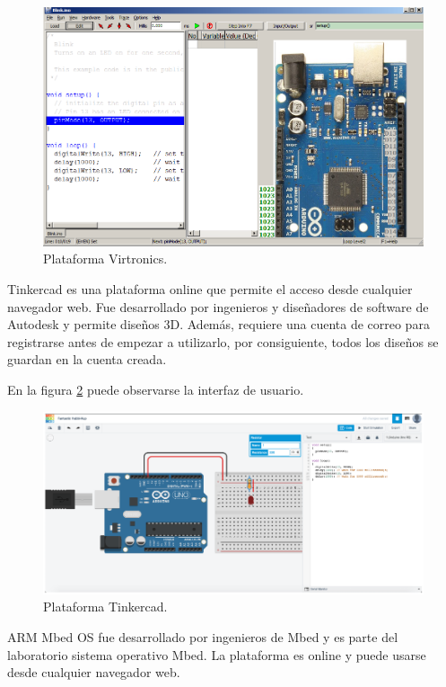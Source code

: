 \begin{figure}[ht]
	\centering
	\includegraphics[scale=.35]{./Figures/Virtronics.png}
	\caption{Plataforma Virtronics.}
	\label{fig:Virtronics}
\end{figure}


Tinkercad \citep{Tinkercad} es una plataforma online que permite el acceso desde cualquier navegador web. Fue desarrollado por ingenieros y diseñadores de software de Autodesk \citep{Autodesk} y permite diseños 3D. Además, requiere una cuenta de correo para registrarse antes de empezar a utilizarlo, por consiguiente, todos los diseños se guardan en la cuenta creada.

En la figura \ref{fig:Tinkercad} puede observarse la interfaz de usuario.

\begin{figure}[ht]
	\centering
	\includegraphics[scale=.42]{./Figures/Tinkercad.png}
	\caption{Plataforma Tinkercad.}
	\label{fig:Tinkercad}
\end{figure}


ARM Mbed OS \citep{ArmMbedSim} fue desarrollado por ingenieros de Mbed \citep{ArmMbed} y es parte del laboratorio sistema operativo Mbed. La plataforma es online y puede usarse desde cualquier navegador web.

